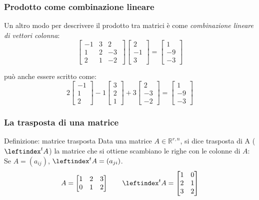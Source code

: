 \documentclass[x11names]{article}
\begin{document}
\subsubsection{Prodotto come combinazione lineare}
Un altro modo per descrivere il prodotto tra matrici è come \textit{combinazione lineare di vettori colonna}:
\[
\begin{bmatrix}
    -1 & 3 & 2 \\
    1 & 2 & -3 \\
    2 & 1 & -2 \
\end{bmatrix}
\begin{bmatrix}
2 \\ -1 \\ 3
\end{bmatrix}
=
\begin{bmatrix}
1 \\ -9  \\ -3
\end{bmatrix}
\] 

può anche essere scritto come:
\[
2 \begin{bmatrix}
-1 \\ 1 \\ 2
\end{bmatrix}
-1
\begin{bmatrix}
3 \\ 2   \\ 1 
\end{bmatrix}
+3
\begin{bmatrix}
2 \\ -3  \\ -2 
\end{bmatrix}
= 
\begin{bmatrix}
1 \\-9  \\-3 
\end{bmatrix}
\] 

\subsubsection{La trasposta di una matrice}
\begin{center}
\colorbox{Azure2}{\begin{minipage}{5.75in}
\begin{blues}{Definizione: matrice trasposta}
    Data una matrice $A \in \mathbb{R}^{r,n}$, si dice trasposta di A ($\leftindex^t{A}$) la matrice che si ottiene scambiano le righe con le colonne di $A$: Se $A = (a_{ij})$, $\leftindex^t{A} = (a_{ji})$.
$$
    A = \begin{bmatrix}
        1 & 2 & 3 \\
        0 & 1 & 2 
    \end{bmatrix}
    \qquad
    \leftindex^t{A} = \begin{bmatrix}
        1 & 0 \\
        2 & 1 \\
        3 & 2
    \end{bmatrix}
$$

\end{blues}
\end{minipage}}        
\end{center}
\end{document}
